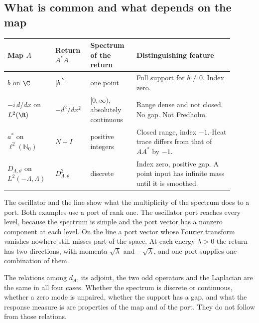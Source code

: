 \subsection{What is common and what depends on the map}
\label{subsec:four-maps-table}

\begin{center}
\small
\begin{tabular}{@{}p{0.17\linewidth}p{0.14\linewidth}p{0.19\linewidth}p{0.40\linewidth}@{}}
\toprule
Map $A$ & Return $A^*A$ & Spectrum of the return & Distinguishing feature \\
\midrule
\raggedright $b$ on $\C$ & $|b|^2$ & \raggedright one point & Full support for $b\ne0$. Index zero. \\[2pt]
\raggedright $-i\,d/dx$ on $L^2(\R)$ & $-d^2/dx^2$ & \raggedright $[0,\infty)$, absolutely continuous & Range dense and not closed. No gap. Not Fredholm. \\[2pt]
\raggedright $a^*$ on $\ell^2(\mathbb N_0)$ & $N+I$ & \raggedright positive integers & Closed range, index $-1$. Heat trace differs from that of $AA^*$ by $-1$. \\[2pt]
\raggedright $D_{\Lambda,\vartheta}$ on $L^2(-\Lambda,\Lambda)$ & $D_{\Lambda,\vartheta}^2$ & \raggedright discrete & Index zero, positive gap. A point input has infinite mass until it is smoothed. \\
\bottomrule
\end{tabular}
\end{center}

The oscillator and the line show what the multiplicity of the spectrum does to a port. Both examples use a port of rank one. The oscillator port reaches every level, because the spectrum is simple and the port vector has a nonzero component at each level. On the line a port vector whose Fourier transform vanishes nowhere still misses part of the space. At each energy $\lambda>0$ the return has two directions, with momenta $\sqrt\lambda$ and $-\sqrt\lambda$, and one port supplies one combination of them.

The relations among $d_A$, its adjoint, the two odd operators and the Laplacian are the same in all four cases. Whether the spectrum is discrete or continuous, whether a zero mode is unpaired, whether the support has a gap, and what the response measure is are properties of the map and of the port. They do not follow from those relations.
